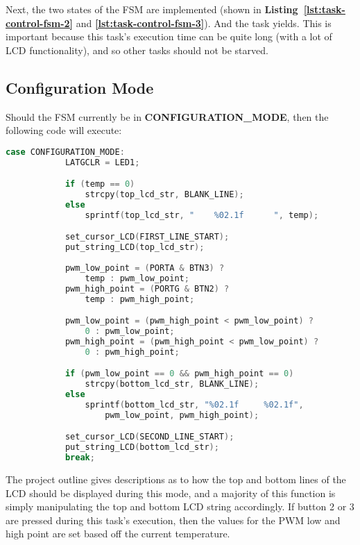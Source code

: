 \documentclass[a4paper, 12pt]{article}
\begin{document}
Next, the two states of the FSM are implemented (shown in \textbf{Listing~\ref{lst:task-control-fsm-2}} and \textbf{\ref{lst:task-control-fsm-3}}). And the task yields. This is important because this task's execution time can be quite long (with a lot of LCD functionality), and so other tasks should not be starved.

\subsection{Configuration Mode}
\label{subsec:configuration-mode}

Should the FSM currently be in \textbf{CONFIGURATION\_MODE}, then the following code will execute:

	\begin{mdframed}[backgroundcolor=code-gray, roundcorner=10pt,
								innerleftmargin=5, innertopmargin=5, innerbottommargin=5]	
	\begin{lstlisting}[language=C, caption=Control Unit - Configuration Mode, tabsize=2, label={lst:task-control-fsm-2}]
	case CONFIGURATION_MODE:
			LATGCLR = LED1;

			if (temp == 0)
				strcpy(top_lcd_str, BLANK_LINE);
			else
				sprintf(top_lcd_str, "	  %02.1f	  ", temp);

			set_cursor_LCD(FIRST_LINE_START);
			put_string_LCD(top_lcd_str);
			
			pwm_low_point = (PORTA & BTN3) ?
				temp : pwm_low_point;
			pwm_high_point = (PORTG & BTN2) ?
				temp : pwm_high_point;

			pwm_low_point = (pwm_high_point < pwm_low_point) ?
				0 : pwm_low_point;
			pwm_high_point = (pwm_high_point < pwm_low_point) ?
				0 : pwm_high_point;

			if (pwm_low_point == 0 && pwm_high_point == 0)
				strcpy(bottom_lcd_str, BLANK_LINE);
			else
				sprintf(bottom_lcd_str, "%02.1f		%02.1f",
					pwm_low_point, pwm_high_point);

			set_cursor_LCD(SECOND_LINE_START);
			put_string_LCD(bottom_lcd_str);
			break;
	\end{lstlisting}
	\end{mdframed}
	
The project outline gives descriptions as to how the top and bottom lines of the LCD should be displayed during this mode, and a majority of this function is simply manipulating the top and bottom LCD string accordingly. If button 2 or 3 are pressed during this task's execution, then the values for the PWM low and high point are set based off the current temperature.
\end{document}

